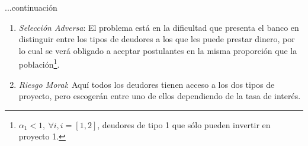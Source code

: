 \documentclass{beamer}
\begin{document}
\begin{frame}{...continuaci\'on}
\begin{enumerate}
\item{\emph{Selecci\'on Adversa}: El problema est\'a en la dificultad que presenta el banco en distinguir entre los tipos de deudores a los que les puede prestar dinero, por lo cual se ver\'a obligado a aceptar postulantes en la misma proporci\'on que la poblaci\'on\footnote{$\alpha_{1}<1,\ \forall i, i=[1,2]$, deudores de tipo 1 que s\'olo pueden invertir en proyecto 1.}.}

\item{\emph{Riesgo Moral}: Aqu\'i todos los deudores tienen acceso a los dos tipos de proyecto, pero escoger\'an entre uno de ellos dependiendo de la tasa de inter\'es.}
\end{enumerate}
\end{frame}
\end{document}
